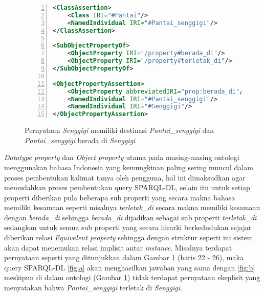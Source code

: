 \begin{figure}[hb]
	\centering
	\begin{lstlisting}[language=XML, numbers=left]
<ClassAssertion>
    <Class IRI="#Pantai"/>
    <NamedIndividual IRI="#Pantai_senggigi"/>
</ClassAssertion>

<SubObjectPropertyOf>
    <ObjectProperty IRI="/property#berada_di"/>
    <ObjectProperty IRI="/property#terletak_di"/>
</SubObjectPropertyOf>

<ObjectPropertyAssertion>
    <ObjectProperty abbreviatedIRI="prop:berada_di"/>
    <NamedIndividual IRI="#Pantai_senggigi"/>
    <NamedIndividual IRI="#Senggigi"/>
</ObjectPropertyAssertion>\end{lstlisting}
	\caption{Pernyataan \emph{Senggigi} memiliki destinasi \emph{Pantai\_senggigi} dan \emph{Pantai\_senggigi} berada di \emph{Senggigi}}
	\label{fig:assertion}
\end{figure}

\emph{Datatype property} dan \emph{Object property} utama pada masing-masing ontologi menggunakan bahasa Indonesia yang kemungkinan paling sering muncul dalam proses pembentukan kalimat tanya oleh pengguna, hal ini dimaksudkan agar memudahkan proses pembentukan query SPARQL-DL, selain itu untuk setiap properti diberikan pula beberapa sub properti yang secara makna bahasa memiliki kesamaan seperti misalnya \emph{terletak\_di} secara makna memiliki kesamaan dengan \emph{berada\_di} sehingga \emph{berada\_di} dijadikan sebagai sub properti \emph{terletak\_di} sedangkan untuk semua sub properti yang secara hirarki berkedudukan sejajar diberikan relasi \emph{Equivalent property} sehingga dengan struktur seperti ini sistem akan dapat menemukan relasi implisit antar \emph{instance}. Misalnya terdapat pernyataan seperti yang ditunjukkan dalam Gambar \ref{fig:assertion} (baris 22 - 26), maka query SPARQL-DL \ref{fig:a} akan menghasilkan jawaban yang sama dengan \ref{fig:b} meskipun di dalam ontologi (Gambar \ref{fig:assertion}) tidak terdapat pernyataan eksplisit yang menyatakan bahwa \emph{Pantai\_senggigi} terletak di \emph{Senggigi}.

